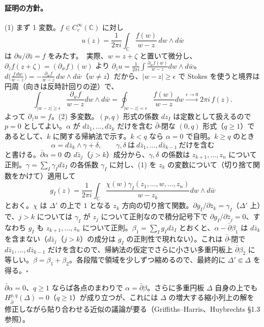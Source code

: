 \paragraph{証明の方針。}(1) まず 1 変数。$f\in C_c^\infty(\mathbb C)$ に対し
\begin{equation}\label{eq:cauchytr}
u(z)=\frac1{2\pi i}\int_{\mathbb C}\frac{f(w)}{w-z}\,dw\wedge d\bar w
\end{equation}
は $\partial u/\partial\bar z=f$ をみたす。\tP\ 実際、$w=z+\zeta$ と置いて微分し、$\partial_{\bar z}f(z+\zeta)=(\partial_{\bar w}f)(w)$ より $\partial_{\bar z}u=\frac1{2\pi i}\int\frac{\partial_{\bar w}f(w)}{w-z}dw\wedge d\bar w$。$d\big(\frac{f\,dw}{w-z}\big)=-\frac{\partial_{\bar w}f}{w-z}\,dw\wedge d\bar w$（$w\ne z$）だから、$|w-z|\ge\epsilon$ で Stokes を使うと境界は円周（向きは反時計回りの逆）で、
\[
\int_{|w-z|\ge\epsilon}\frac{\partial_{\bar w}f}{w-z}dw\wedge d\bar w=\oint_{|w-z|=\epsilon}\frac{f(w)}{w-z}dw\xrightarrow{\epsilon\to0}2\pi i\,f(z).
\]
よって $\partial_{\bar z}u=f$。(2) 多変数。$(p,q)$ 形式の係数 $dz_I$ は定数として扱えるので $p=0$ としてよい。$\alpha$ が $d\bar z_1,\dots,d\bar z_k$ だけを含む $\bar\partial$-閉な $(0,q)$ 形式（$q\ge1$）であるとして、$k$ に関する帰納法で示す。$k<q$ なら $\alpha=0$ で自明。$k\ge q$ のとき
\[
\alpha=d\bar z_k\wedge\gamma+\delta,\qquad\gamma,\delta\ \text{は}\ d\bar z_1,\dots,d\bar z_{k-1}\ \text{だけを含む}
\]
と書ける。$\bar\partial\alpha=0$ の $d\bar z_j$（$j>k$）成分から、$\gamma,\delta$ の係数は $z_{k+1},\dots,z_n$ について正則。$\gamma=\sum_I\gamma_Id\bar z_I$ の各係数 $\gamma_I$ に対し、(1) を $z_k$ の変数について（切り捨て関数をかけて）適用して
\[
g_I(z)=\frac1{2\pi i}\int_{\mathbb C}\frac{\chi(w)\gamma_I(z_1,\dots,w,\dots,z_n)}{w-z_k}dw\wedge d\bar w
\]
とおく。$\chi$ は $\Delta'$ の上で $1$ となる $z_k$ 方向の切り捨て関数。$\partial g_I/\partial\bar z_k=\gamma_I$（$\Delta'$ 上）で、$j>k$ については $\gamma_I$ が $z_j$ について正則なので積分記号下で $\partial g_I/\partial\bar z_j=0$、すなわち $g_I$ も $z_{k+1},\dots,z_n$ について正則。$\beta_1=\sum_Ig_Id\bar z_I$ とおくと、$\alpha-\bar\partial\beta_1$ は $d\bar z_k$ を含まない（$d\bar z_j$（$j>k$）の成分は $g_I$ の正則性で現れない）。これは $\bar\partial$-閉で $d\bar z_1,\dots,d\bar z_{k-1}$ だけを含むので、帰納法の仮定でさらに小さい多重円板上 $\bar\partial\beta_2$ に等しい。$\beta=\beta_1+\beta_2$。各段階で領域を少しずつ縮めるので、最終的に $\Delta'\Subset\Delta$ を得る。\hfill$\square$

\begin{cor}
$\bar\partial\alpha=0$、$q\ge1$ ならば各点のまわりで $\alpha=\bar\partial\beta$。さらに多重円板 $\Delta$ 自身の上でも $H^{p,q}_{\bar\partial}(\Delta)=0$（$q\ge1$）が成り立つが、これには $\Delta$ の増大する縮小列上の解を修正しながら貼り合わせる近似の議論が要る（Griffiths--Harris、Huybrechts \S1.3 参照）\tC。
\end{cor}

